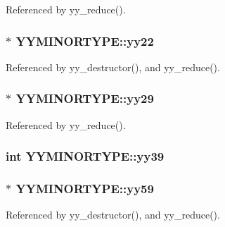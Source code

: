 Referenced by yy\-\_\-reduce().

\hypertarget{unionYYMINORTYPE_acb24cb1314350395bd4d90ee4ac8a8fc}{
\subsubsection[{yy22}]{$\ast$ Y\-Y\-M\-I\-N\-O\-R\-T\-Y\-P\-E\-::yy22}}\label{unionYYMINORTYPE_acb24cb1314350395bd4d90ee4ac8a8fc}


Referenced by yy\-\_\-destructor(), and yy\-\_\-reduce().

\hypertarget{unionYYMINORTYPE_a3648227006906254944781d24406f2d3}{
\subsubsection[{yy29}]{$\ast$ Y\-Y\-M\-I\-N\-O\-R\-T\-Y\-P\-E\-::yy29}}\label{unionYYMINORTYPE_a3648227006906254944781d24406f2d3}


Referenced by yy\-\_\-reduce().

\hypertarget{unionYYMINORTYPE_afa3974d934e48984f72169ad62cf8a71}{
\subsubsection[{yy39}]{\setlength{\rightskip}{0pt plus 5cm}int Y\-Y\-M\-I\-N\-O\-R\-T\-Y\-P\-E\-::yy39}}\label{unionYYMINORTYPE_afa3974d934e48984f72169ad62cf8a71}
\hypertarget{unionYYMINORTYPE_a894325c839dab371d85e73fe78713efe}{
\subsubsection[{yy59}]{$\ast$ Y\-Y\-M\-I\-N\-O\-R\-T\-Y\-P\-E\-::yy59}}\label{unionYYMINORTYPE_a894325c839dab371d85e73fe78713efe}


Referenced by yy\-\_\-destructor(), and yy\-\_\-reduce().

